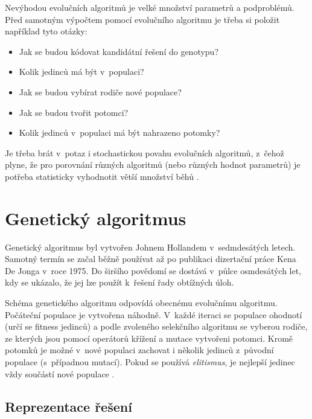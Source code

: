 Nevýhodou evolučních algoritmů je velké množství parametrů a podproblémů. Před samotným výpočtem pomocí evolučního algoritmu je třeba si položit například tyto otázky:

\begin{itemize}
    \item Jak se budou kódovat kandidátní řešení do genotypu?
    \item Kolik jedinců má být v~populaci?
    \item Jak se budou vybírat rodiče nové populace?
    \item Jak se budou tvořit potomci?
    \item Kolik jedinců v~populaci má být nahrazeno potomky?
\end{itemize}

Je třeba brát v~potaz i stochastickou povahu evolučních algoritmů, z~čehož plyne, že pro porovnání různých algoritmů (nebo různých hodnot parametrů) je potřeba statisticky vyhodnotit větší množství běhů \cite{HandbookEA, Modra}.


\section{Genetický algoritmus}
\label{secGA}

Genetický algoritmus byl vytvořen Johnem Hollandem v~sedmdesátých letech. Samotný termín  se začal běžně používat až po publikaci dizertační práce Kena De Jonga v~roce 1975. Do širšího povědomí se dostává v~půlce osmdesátých let, kdy se ukázalo, že jej lze použít k~řešení řady obtížných úloh.


Schéma genetického algoritmu odpovídá obecnému evolučnímu algoritmu. Počáteční populace je vytvořena náhodně. V~každé iteraci se populace ohodnotí (určí se fitness jedinců) a podle zvoleného selekčního algoritmu se vyberou rodiče, ze kterých jsou pomocí operátorů křížení a mutace vytvořeni potomci. Kromě potomků je možné v~nové populaci zachovat i několik jedinců z~původní populace (s~případnou mutací). Pokud se používá \emph{elitismus}, je nejlepší jedinec vždy součástí nové populace \cite{Modra, HandbookGA}.


\subsection{Reprezentace řešení}

